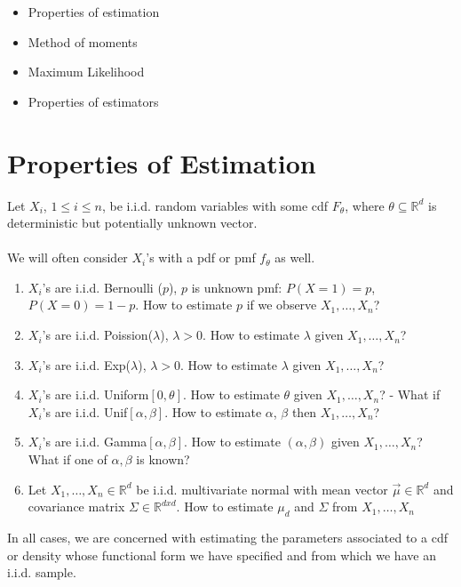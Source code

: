\begin{itemize}
	\item Properties of estimation
	\item Method of moments
	\item Maximum Likelihood
	\item Properties of estimators
\end{itemize}
\section*{Properties of Estimation}
Let $X_i$, $1 \leq i \leq n$, be i.i.d. random variables with some cdf $F_\theta$, where $\theta \subseteq \mathbb{R}^d$ is deterministic but potentially unknown vector.\\\\
We will often consider $X_i$'s with a pdf or pmf $f_\theta$ as well.
\begin{example}
	\begin{enumerate}
		\item $X_i$'s are i.i.d. Bernoulli ($p$), $p$ is unknown pmf: $P(X = 1) = p$, $P(X = 0) = 1-p$. How to estimate $p$ if we observe $X_1, \ldots, X_n$?
		\item $X_i$'s are i.i.d. Poission($\lambda$), $\lambda > 0$. How to estimate $\lambda$ given $X_1, \ldots, X_n$?
		\item $X_i$'s are i.i.d. Exp($\lambda$), $\lambda > 0$. How to estimate $\lambda$ given $X_1, \ldots, X_n$?
		\item $X_i$'s are i.i.d. Uniform$[0, \theta]$. How to estimate $\theta$ given $X_1, \ldots, X_n$? - What if $X_i$'s are i.i.d. Unif$[\alpha, \beta]$. How to estimate $\alpha$, $\beta$ then $X_1, \ldots, X_n$?
		\item $X_i$'s are i.i.d. Gamma$[\alpha, \beta]$. How to estimate $(\alpha, \beta)$ given $X_1, \ldots, X_n$? What if one of $\alpha, \beta$ is known?
		\item Let $X_1, \ldots, X_n \in \mathbb{R}^d$ be i.i.d. multivariate normal with mean vector $\vec{\mu} \in \mathbb{R}^d$ and covariance matrix $\Sigma \in \mathbb{R}^{dxd}$. How to estimate $\mu_d$ and $\Sigma$ from $X_1, \ldots, X_n$
	\end{enumerate}
\end{example}
In all cases, we are concerned with estimating the parameters associated to a cdf or density whose functional form we have specified and from which we have an i.i.d. sample. \\\\
